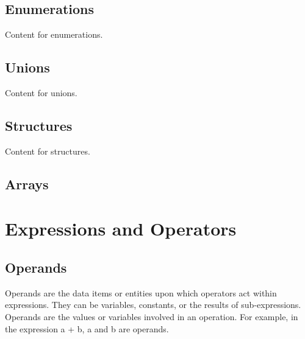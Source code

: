 \documentclass[11pt,A4]{article}
\begin{document}
        \subsection{Enumerations}
        Content for enumerations.
        
        \subsection{Unions}
        Content for unions.
        
        \subsection{Structures}
        Content for structures.
        
        \subsection{Arrays}
        

    \newpage
    \section{Expressions and Operators}
        
        \subsection{Operands}
        Operands are the data items or entities upon which operators act within expressions. They can be variables, constants, or the results of sub-expressions. Operands are the values or variables involved in an operation. For example, in the expression a + b, a and b are operands.
        
\end{document}
